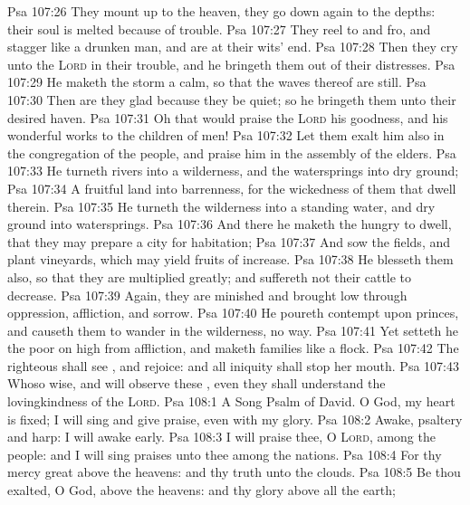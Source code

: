 \vs Psa 107:26 They mount up to the heaven, they go down again to the depths: their soul is melted because of trouble.
\vs Psa 107:27 They reel to and fro, and stagger like a drunken man, and are at their wits' end.
\vs Psa 107:28 Then they cry unto the \textsc{Lord} in their trouble, and he bringeth them out of their distresses.
\vs Psa 107:29 He maketh the storm a calm, so that the waves thereof are still.
\vs Psa 107:30 Then are they glad because they be quiet; so he bringeth them unto their desired haven.
\vs Psa 107:31 Oh that  would praise the \textsc{Lord}  his goodness, and  his wonderful works to the children of men!
\vs Psa 107:32 Let them exalt him also in the congregation of the people, and praise him in the assembly of the elders.
\vs Psa 107:33 He turneth rivers into a wilderness, and the watersprings into dry ground;
\vs Psa 107:34 A fruitful land into barrenness, for the wickedness of them that dwell therein.
\vs Psa 107:35 He turneth the wilderness into a standing water, and dry ground into watersprings.
\vs Psa 107:36 And there he maketh the hungry to dwell, that they may prepare a city for habitation;
\vs Psa 107:37 And sow the fields, and plant vineyards, which may yield fruits of increase.
\vs Psa 107:38 He blesseth them also, so that they are multiplied greatly; and suffereth not their cattle to decrease.
\vs Psa 107:39 Again, they are minished and brought low through oppression, affliction, and sorrow.
\vs Psa 107:40 He poureth contempt upon princes, and causeth them to wander in the wilderness,  no way.
\vs Psa 107:41 Yet setteth he the poor on high from affliction, and maketh  families like a flock.
\vs Psa 107:42 The righteous shall see , and rejoice: and all iniquity shall stop her mouth.
\vs Psa 107:43 Whoso  wise, and will observe these , even they shall understand the lovingkindness of the \textsc{Lord}.
\vs Psa 108:1 A Song  Psalm of David. O God, my heart is fixed; I will sing and give praise, even with my glory.
\vs Psa 108:2 Awake, psaltery and harp: I  will awake early.
\vs Psa 108:3 I will praise thee, O \textsc{Lord}, among the people: and I will sing praises unto thee among the nations.
\vs Psa 108:4 For thy mercy  great above the heavens: and thy truth  unto the clouds.
\vs Psa 108:5 Be thou exalted, O God, above the heavens: and thy glory above all the earth;
